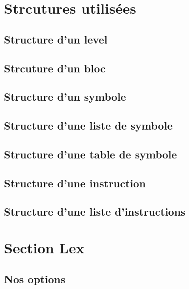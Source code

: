 \documentclass[a4paper, 11pt]{report}
\begin{document}
\section{Strcutures utilisées}

\subsection{Structure d'un level}


\subsection{Strcuture d'un bloc}


\subsection{Structure d'un symbole}


\subsection{Structure d'une liste de symbole}


\subsection{Structure d'une table de symbole}


\subsection{Structure d'une instruction}


\subsection{Structure d'une liste d'instructions}


\section{Section Lex}

\subsection{Nos options}

\end{document}
